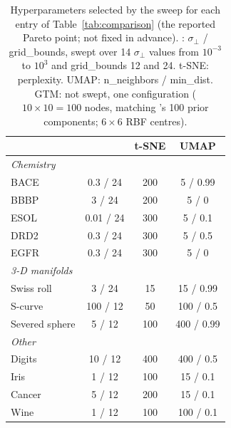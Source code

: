 \begin{table}[t]
\centering
\footnotesize
\setlength{\tabcolsep}{3.5pt}
\caption{Hyperparameters selected by the sweep for each entry of Table~\ref{tab:comparison} (the reported Pareto point; not fixed in advance). \nfmap{}: $\sigma_\perp$ / grid\_bounds, swept over 14 $\sigma_\perp$ values from $10^{-3}$ to $10^{3}$ and grid\_bounds 12 and 24. t-SNE: perplexity. UMAP: n\_neighbors / min\_dist. GTM: not swept, one configuration ($10\times10 = 100$ nodes, matching \nfmap{}'s 100 prior components; $6\times6$ RBF centres).}
\label{tab:settings}
\begin{tabular}{lccc}
\toprule
 & \nfmap{} & t-SNE & UMAP \\
\midrule
\multicolumn{4}{l}{\textit{Chemistry}} \\
\quad BACE & 0.3 / 24 & 200 & 5 / 0.99 \\
\quad BBBP & 3 / 24 & 200 & 5 / 0 \\
\quad ESOL & 0.01 / 24 & 300 & 5 / 0.1 \\
\quad DRD2 & 0.3 / 24 & 300 & 5 / 0.5 \\
\quad EGFR & 0.3 / 24 & 300 & 5 / 0 \\
\multicolumn{4}{l}{\textit{3-D manifolds}} \\
\quad Swiss roll & 3 / 24 & 15 & 15 / 0.99 \\
\quad S-curve & 100 / 12 & 50 & 100 / 0.5 \\
\quad Severed sphere & 5 / 12 & 100 & 400 / 0.99 \\
\multicolumn{4}{l}{\textit{Other}} \\
\quad Digits & 10 / 12 & 400 & 400 / 0.5 \\
\quad Iris & 1 / 12 & 100 & 15 / 0.1 \\
\quad Cancer & 5 / 12 & 200 & 15 / 0.1 \\
\quad Wine & 1 / 12 & 100 & 100 / 0.1 \\
\bottomrule
\end{tabular}
\end{table}
